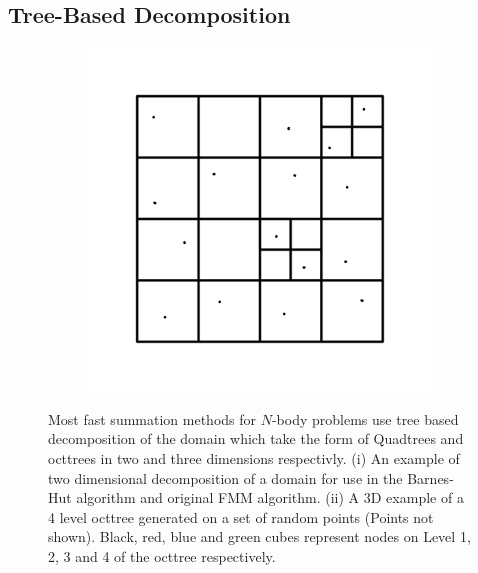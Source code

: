 \subsection{Tree-Based Decomposition} \label{sec:TreeDecomp}

\begin{figure}
    \begin{subfigure}[b]{0.4\textwidth}
        \centering
        \includegraphics[width=\textwidth]{Images/KIFMM/Decomposition.pdf}
        \caption{\label{fig:2DDecompostion}}
    \end{subfigure}
    \hfill
    \begin{subfigure}[b]{0.4\textwidth}
    \centering
        \resizebox{\linewidth}{!}{}
        \caption{\label{fig:Decompostionexample}}
    \end{subfigure}
    \caption[Decomposition of domain in two and three dimensions.]{Most fast summation methods for $N$-body problems use tree based decomposition of the domain which take the form of Quadtrees and octtrees in two and three dimensions respectivly. (i) An example of two dimensional decomposition of a domain for use in the Barnes-Hut algorithm and original FMM algorithm. (ii) A 3D example of a 4 level octtree generated on a set of random points (Points not shown). Black, red, blue and green cubes represent nodes on Level 1, 2, 3 and 4 of the octtree respectively.}
\end{figure}

